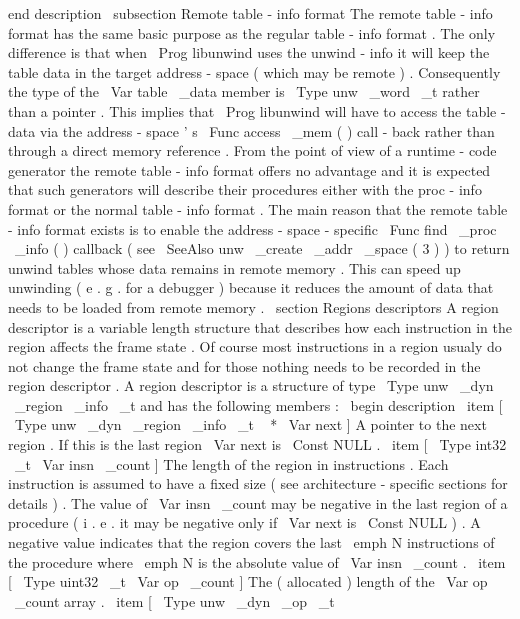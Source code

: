 end
{
description
}
\
subsection
{
Remote
table
-
info
format
}
The
remote
table
-
info
format
has
the
same
basic
purpose
as
the
regular
table
-
info
format
.
The
only
difference
is
that
when
\
Prog
{
libunwind
}
uses
the
unwind
-
info
it
will
keep
the
table
data
in
the
target
address
-
space
(
which
may
be
remote
)
.
Consequently
the
type
of
the
\
Var
{
table
\
_data
}
member
is
\
Type
{
unw
\
_word
\
_t
}
rather
than
a
pointer
.
This
implies
that
\
Prog
{
libunwind
}
will
have
to
access
the
table
-
data
via
the
address
-
space
'
s
\
Func
{
access
\
_mem
}
(
)
call
-
back
rather
than
through
a
direct
memory
reference
.
From
the
point
of
view
of
a
runtime
-
code
generator
the
remote
table
-
info
format
offers
no
advantage
and
it
is
expected
that
such
generators
will
describe
their
procedures
either
with
the
proc
-
info
format
or
the
normal
table
-
info
format
.
The
main
reason
that
the
remote
table
-
info
format
exists
is
to
enable
the
address
-
space
-
specific
\
Func
{
find
\
_proc
\
_info
}
(
)
callback
(
see
\
SeeAlso
{
unw
\
_create
\
_addr
\
_space
}
(
3
)
)
to
return
unwind
tables
whose
data
remains
in
remote
memory
.
This
can
speed
up
unwinding
(
e
.
g
.
for
a
debugger
)
because
it
reduces
the
amount
of
data
that
needs
to
be
loaded
from
remote
memory
.
\
section
{
Regions
descriptors
}
A
region
descriptor
is
a
variable
length
structure
that
describes
how
each
instruction
in
the
region
affects
the
frame
state
.
Of
course
most
instructions
in
a
region
usualy
do
not
change
the
frame
state
and
for
those
nothing
needs
to
be
recorded
in
the
region
descriptor
.
A
region
descriptor
is
a
structure
of
type
\
Type
{
unw
\
_dyn
\
_region
\
_info
\
_t
}
and
has
the
following
members
:
\
begin
{
description
}
\
item
[
\
Type
{
unw
\
_dyn
\
_region
\
_info
\
_t
~
*
}
\
Var
{
next
}
]
A
pointer
to
the
next
region
.
If
this
is
the
last
region
\
Var
{
next
}
is
\
Const
{
NULL
}
.
\
item
[
\
Type
{
int32
\
_t
}
\
Var
{
insn
\
_count
}
]
The
length
of
the
region
in
instructions
.
Each
instruction
is
assumed
to
have
a
fixed
size
(
see
architecture
-
specific
sections
for
details
)
.
The
value
of
\
Var
{
insn
\
_count
}
may
be
negative
in
the
last
region
of
a
procedure
(
i
.
e
.
it
may
be
negative
only
if
\
Var
{
next
}
is
\
Const
{
NULL
}
)
.
A
negative
value
indicates
that
the
region
covers
the
last
\
emph
{
N
}
instructions
of
the
procedure
where
\
emph
{
N
}
is
the
absolute
value
of
\
Var
{
insn
\
_count
}
.
\
item
[
\
Type
{
uint32
\
_t
}
\
Var
{
op
\
_count
}
]
The
(
allocated
)
length
of
the
\
Var
{
op
\
_count
}
array
.
\
item
[
\
Type
{
unw
\
_dyn
\
_op
\
_t
}
